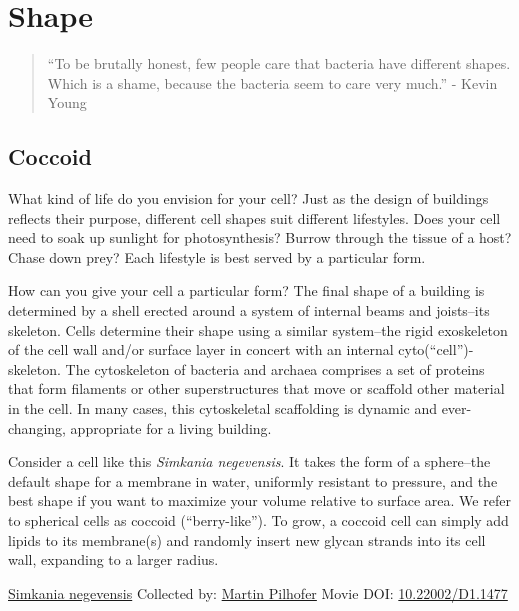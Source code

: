 \documentclass[]{tufte-book}
\begin{document}
\hypertarget{shape}{%
\chapter{Shape}\label{shape}}

\begin{quote}
``To be brutally honest, few people care that bacteria have different shapes. Which is a shame, because the bacteria seem to care very much.''
- Kevin Young \citep{young2006}
\end{quote}

\hypertarget{coccoid}{%
\section{Coccoid}\label{coccoid}}

What kind of life do you envision for your cell? Just as the design of buildings reflects their purpose, different cell shapes suit different lifestyles. Does your cell need to soak up sunlight for photosynthesis? Burrow through the tissue of a host? Chase down prey? Each lifestyle is best served by a particular form.

How can you give your cell a particular form? The final shape of a building is determined by a shell erected around a system of internal beams and joists--its skeleton. Cells determine their shape using a similar system--the rigid exoskeleton of the cell wall and/or surface layer in concert with an internal cyto(``cell'')-skeleton. The cytoskeleton of bacteria and archaea comprises a set of proteins that form filaments or other superstructures that move or scaffold other material in the cell. In many cases, this cytoskeletal scaffolding is dynamic and ever-changing, appropriate for a living building.

Consider a cell like this \emph{Simkania negevensis}. It takes the form of a sphere--the default shape for a membrane in water, uniformly resistant to pressure, and the best shape if you want to maximize your volume relative to surface area. We refer to spherical cells as coccoid (``berry-like''). To grow, a coccoid cell can simply add lipids to its membrane(s) and randomly insert new glycan strands into its cell wall, expanding to a larger radius.



\hypertarget{htmlwidget-61e7318d78ecfbee263b}{}

\label{fig:3-1}\protect\hyperlink{tree}{Simkania negevensis} Collected by: \protect\hyperlink{martin_pilhofer}{Martin Pilhofer} Movie DOI: \href{https://doi.org/10.22002/D1.1477}{10.22002/D1.1477}
\end{document}
